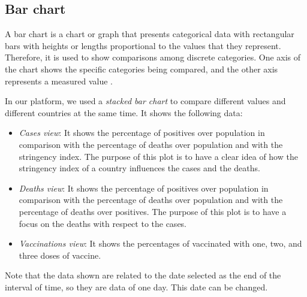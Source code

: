 \documentclass[10pt,conference]{IEEEtran}
\begin{document}
\begin{figure}
\end{figure}

\subsection{Bar chart}
A bar chart is a chart or graph that presents categorical data with rectangular bars with heights or lengths proportional 
to the values that they represent. Therefore, it is used to show comparisons among discrete categories. One axis of the chart 
shows the specific categories being compared, and the other axis represents a measured value \cite{barchart}.

In our platform, we used a {\em stacked bar chart} to compare different values and different countries at the same time. 
It shows the following data:
\begin{itemize}
 \item {\em Cases view}: It shows the percentage of positives over population in comparison with the percentage of deaths over population and with the stringency index. The purpose of this plot is to have a clear idea of how the stringency index of a country influences the cases and the deaths.
 \item {\em Deaths view}: It shows the percentage of positives over population in comparison with the percentage of deaths over population and with the percentage of deaths over positives. The purpose of this plot is to have a focus on the deaths with respect to the cases.
 \item {\em Vaccinations view}: It shows the percentages of vaccinated with one, two, and three doses of vaccine.
\end{itemize}

Note that the data shown are related to the date selected as the end of the interval of time, so they are data of one day. This date can be changed.
\end{document}
